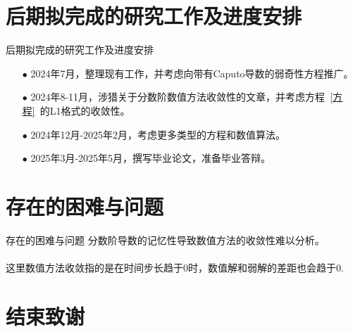 \documentclass[aspectratio=16 9, 10pt, notheorems]{ctexbeamer}
\let\oldeqref\eqref
\renewcommand{\eqref}[1]{~\oldeqref{#1}~}
\newcommand{\mainEquation}{方程\eqref{方程}}
\begin{document}
\section{后期拟完成的研究工作及进度安排}
\begin{frame}{后期拟完成的研究工作及进度安排}
    \begin{itemize}\setlength{\itemsep}{1.5em}
        \item[$\bullet$] 2024年7月，整理现有工作，并考虑向带有Caputo导数的弱奇性方程推广。
        \item[$\bullet$] 2024年8-11月，涉猎关于分数阶数值方法收敛性的文章，并考虑\mainEquation 的L1格式的收敛性。
        \item[$\bullet$] 2024年12月-2025年2月，考虑更多类型的方程和数值算法。
        \item[$\bullet$] 2025年3月-2025年5月，撰写毕业论文，准备毕业答辩。
    \end{itemize}
\end{frame}

\section{存在的困难与问题}
\begin{frame}{存在的困难与问题}
    分数阶导数的记忆性导致数值方法的收敛性难以分析。
    \\~\\
    这里数值方法收敛指的是在时间步长趋于0时，数值解和弱解的差距也会趋于0.
\end{frame}

\section*{结束致谢}

{
    \begin{frame} \end{frame}
}
\end{document}
